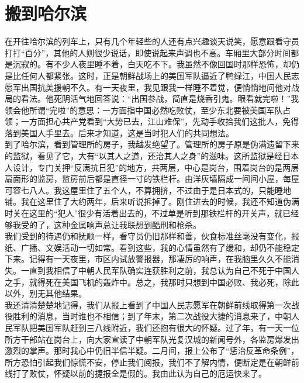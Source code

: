 \fancyhead[RO]{\thepage} %
\fancyhead[LE]{\thepage} %
\chapter*{搬到哈尔滨}
在开往哈尔滨的列车上，只有几个年轻些的人还有点兴趣谈天说笑，愿意跟看守员打打“百分”，其他的人则很少说话，即使说起来声调也不高。车厢里大部分时间都是沉寂的。有不少人夜里睡不着，白天吃不下。我虽然不像回国时那样恐怖，却仍是比任何人都紧张。这时，正是朝鲜战场上的美国军队逼近了鸭绿江，中国人民志愿军出国抗美援朝不久。有一天夜里，我见跟我一样睡不着觉，便悄悄地问他对战局的看法。他死阴活气地回答说：“出国参战，简直是烧香引鬼。眼看就完啦！”我领会他所谓“完啦”的意思：一方面指中国必然吃败仗，至少东北要被美国军队占领；一方面担心共产党看到“大势已去，江山难保”，先动手收拾我们这批人，免得落到美国人手里去。后来才知道，这是当时犯人们的共同想法。\\

到了哈尔滨，看到管理所的房子，我越发绝望了。管理所的房子原是伪满遗留下来的监狱，看见了它，大有“以其人之道，还治其人之身”的滋味。这所监狱是经日本人设计，专门关押“反满抗日犯”的地方，共两层，中心是岗台，围着岗台的是两层扇面形的监房，监房前后都是直径一寸的铁栏杆。由洋灰墙隔成一间间小屋，每屋可容七八人。我这屋里住了五个人，不算拥挤，不过由于是日本式的，只能睡地铺。我在这里住了大约两年，后来听说拆掉了。刚住进去的时候，我还不知道伪满时关在这里的“犯人”很少有活着出去的，不过单是听到那铁栏杆的开关声，就已经够我受的了，这种金属响声总让我联想到酷刑和枪杀。\\

我们受到的待遇仍和抚顺一样，看守员仍旧那样和善，伙食标准丝毫没有变化，报纸、广播、文娱活动一切如常。看到这些，我的心情虽然有了缓和，却仍不能稳定下来。记得有一天夜里，市区内试放警报器，那凄厉的响声，在我脑里久久不能消失。一直到我相信了中朝人民军队确实连获胜利之前，我总认为自己不死于中国人之手，就得死在美国飞机的轰炸中。总之，我那时只想到中国必败、我必死，除此以外，别无其他结果。\\

我还清清楚楚地记得，我们从报上看到了中国人民志愿军在朝鲜前线取得第一次战役胜利的消息，当时谁也不相信；到了年末，第二次战役大捷的消息来了，中朝人民军队把美国军队赶到三八线附近，我们还抱有很大的怀疑。过了年，有一天一位所方干部站在岗台上，向大家宣读了中朝军队光复汉城的新闻号外，各监房爆发出激烈的掌声。那时我心中仍旧半信半疑。二月间，报上公布了“惩治反革命条例”，所方恐怕引起我们惊慌不安，停止我们阅报，我们不了解内情，便断定是在朝鲜前线打了败仗，怀疑以前的捷报全是假的。我由此认为自己的厄运快来了。\\

